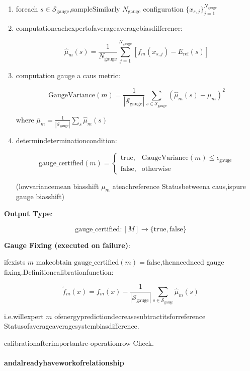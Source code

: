 \documentclass[
  12pt,
]{article}
\begin{document}
\begin{enumerate}
\def\labelenumi{\arabic{enumi}.}
\item
  foreach \(s \in \mathcal{S}_{\text{gauge}}\),sampleSimilarly \(N_{\text{gauge}}\)
   configuration \(\{x_{s,j}\}_{j=1}^{N_{\text{gauge}}}\)
\item
  computationeachexpertofaverageaveragebiasdifference:

  \[\hat{\mu}_m(s) = \frac{1}{N_{\text{gauge}}} \sum_{j=1}^{N_{\text{gauge}}} \left[f_m(x_{s,j}) - E_{\text{ref}}(s)\right]\]
\item
  computation gauge a caus metric:

  \[\text{GaugeVariance}(m) = \frac{1}{|\mathcal{S}_{\text{gauge}}|} \sum_{s \in \mathcal{S}_{\text{gauge}}} \left(\hat{\mu}_m(s) - \bar{\mu}_m\right)^2\]

  where
  \(\bar{\mu}_m = \frac{1}{|\mathcal{S}_{\text{gauge}}|} \sum_{s} \hat{\mu}_m(s)\)
\item
  determindeterminationcondition:

  \[\text{gauge\_certified}(m) = \begin{cases}
  \text{true}, & \text{GaugeVariance}(m) \le \epsilon_{\text{gauge}} \\
  \text{false}, & \text{otherwise}
  \end{cases}\]

  (lowvariancemean  biasshift \(\mu_m\) ateachreference Statusbetweena caus,ispure gauge biasshift)
\end{enumerate}

\textbf{Output Type}:

\[\text{gauge\_certified}: [M] \to \{\text{true}, \text{false}\}\]

\textbf{Gauge Fixing (executed on failure)}:

ifexists \(m\) makeobtain \(\text{gauge\_certified}(m) = \text{false}\),thenneedneed
gauge fixing.Definitioncalibrationfunction:

\[\tilde{f}_m(x) = f_m(x) - \frac{1}{|\mathcal{S}_{\text{gauge}}|} \sum_{s \in \mathcal{S}_{\text{gauge}}} \hat{\mu}_m(s)\]

i.e.willexpert \(m\) ofenergypredictiondecreasesubtractitsforreference Statusofaverageaveragesystembiasdifference.

calibrationafterimportantre-operationrow Check.

\paragraph{andalreadyhaveworkofrelationship}\label{ux4e0eux5df2ux6709ux5de5ux4f5cux7684ux5173ux7cfb}
\end{document}
